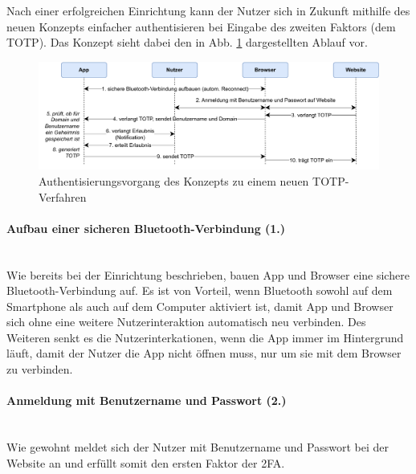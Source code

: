 Nach einer erfolgreichen Einrichtung kann der Nutzer sich in Zukunft mithilfe des neuen Konzepts einfacher authentisieren bei Eingabe des zweiten Faktors (dem TOTP). Das Konzept sieht dabei den in Abb. \ref{fig: konzept login} dargestellten Ablauf vor.

\begin{figure}
    \centering
    \includegraphics[width=1\linewidth]{figures/konzept_login.pdf}
    \caption[Authentisierungsvorgang des Konzepts zu einem neuen TOTP-Verfahren]{Authentisierungsvorgang des Konzepts zu einem neuen TOTP-Verfahren}
    \label{fig: konzept login}
\end{figure}

\paragraph*{Aufbau einer sicheren Bluetooth-Verbindung (1.)}
\mbox{} \vspace{0.1cm} \\
Wie bereits bei der Einrichtung beschrieben, bauen App und Browser eine sichere 
Bluetooth-Verbindung auf. Es ist von Vorteil, wenn Bluetooth sowohl auf dem 
Smartphone als auch auf dem Computer aktiviert ist, damit App und Browser sich 
ohne eine weitere Nutzerinteraktion automatisch neu verbinden. Des Weiteren senkt 
es die Nutzerinterkationen, wenn die App immer im Hintergrund läuft, damit der 
Nutzer die App nicht öffnen muss, nur um sie mit dem Browser zu verbinden.

\paragraph*{Anmeldung mit Benutzername und Passwort (2.)}
\mbox{} \vspace{0.1cm} \\
Wie gewohnt meldet sich der Nutzer mit Benutzername und Passwort bei der Website 
an und erfüllt somit den ersten Faktor der 2FA.

